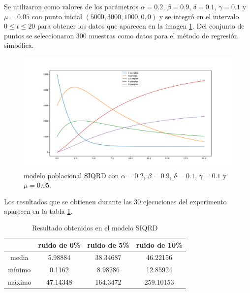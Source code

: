 Se utilizaron como valores de los parámetros $\alpha = 0.2$, $\beta = 0.9$, $\delta = 0.1$, $\gamma = 0.1$ y $\mu = 0.05$ con punto inicial $(5000, 3000, 1000, 0, 0)$ y se integró en el intervalo $0 \leq t \leq 20$ para obtener los datos que aparecen en la imagen \ref{fig:SIQRD}. Del conjunto de puntos se seleccionaron 300 muestras como datos para el método de regresión simbólica.

\begin{figure}[h]
    \centering
    \includegraphics[width=\textwidth]{"figures/SIQRD.pdf"}
    \caption{modelo poblacional SIQRD con $\alpha = 0.2$, $\beta = 0.9$, $\delta = 0.1$, $\gamma = 0.1$ y $\mu = 0.05$.}
    \label{fig:SIQRD}
\end{figure}

Los resultados que se obtienen durante las 30 ejecuciones del experimento aparecen en la tabla \ref{table:experiment_SIQRD}.

\begin{table}[!h]
    \centering
    \caption{Resultado obtenidos en el modelo SIQRD}
    \begin{tabular}{|c|c|c|c|}
        \hline
               & \textbf{ruido de 0\%} & \textbf{ruido de 5\%} & \textbf{ruido de 10\%} \\
        \hline
        media  & 5.98884               & 38.34687              & 46.22156               \\
        \hline
        mínimo & 0.1162                & 8.98286               & 12.85924               \\
        \hline
        máximo & 47.14348              & 164.3472              & 259.10153              \\
        \hline
    \end{tabular}
    \label{table:experiment_SIQRD}
\end{table}


